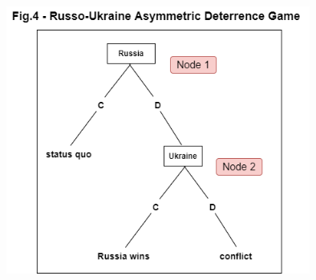 \documentclass[runningheads]{llncs}
\begin{document}
\begin{center}
    \includegraphics[width=10cm]{russia_1.png}
\end{center}
\end{document}
